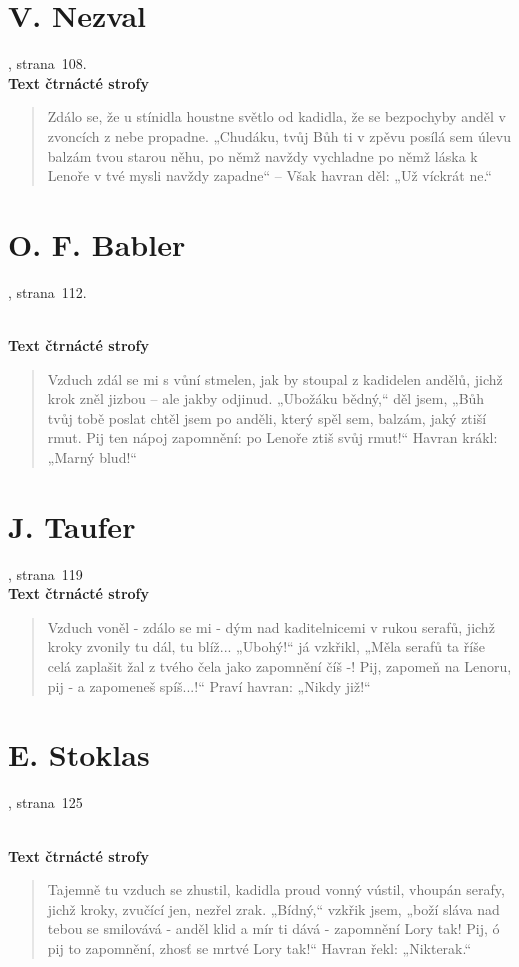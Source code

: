 \documentclass[dp.tex]{subfiles}
\begin{document}
\section*{V. Nezval}
, strana~108.
\\\textbf{Text čtrnácté strofy}
\begin{verse}
Zdálo se, že u stínidla houstne světlo od kadidla,
že se bezpochyby anděl v zvoncích z nebe propadne.
„Chudáku, tvůj Bůh ti v zpěvu posílá sem úlevu
balzám tvou starou něhu, po němž navždy vychladne
po němž láska k Lenoře v tvé mysli navždy zapadne“ –
Však havran děl: „Už víckrát ne.“
\end{verse}

\section*{O. F. Babler}
, strana~112.
\begin{samepage}
\\\textbf{Text čtrnácté strofy}
\begin{verse}
Vzduch zdál se mi s vůní stmelen, jak by stoupal z kadidelen
andělů, jichž krok zněl jizbou – ale jakby odjinud.
„Ubožáku bědný,“ děl jsem, „Bůh tvůj tobě poslat chtěl jsem
po anděli, který spěl sem, balzám, jaký ztiší rmut.
Pij ten nápoj zapomnění: po Lenoře ztiš svůj rmut!“
Havran krákl: „Marný blud!“
\end{verse}
\end{samepage}

\section*{J. Taufer}
, strana~119
\\\textbf{Text čtrnácté strofy}
\begin{verse}
Vzduch voněl - zdálo se mi - dým nad kaditelnicemi
v rukou serafů, jichž kroky zvonily tu dál, tu blíž...
„Ubohý!“ já vzkřikl, „Měla serafů ta říše celá
zaplašit žal z tvého čela jako zapomnění číš -!
Pij, zapomeň na Lenoru, pij - a zapomeneš spíš...!“
Praví havran: „Nikdy již!“
\end{verse}

\section*{E. Stoklas}
, strana~125
\begin{samepage}
\\\textbf{Text čtrnácté strofy}
\begin{verse}
Tajemně tu vzduch se zhustil, kadidla proud vonný vústil,
vhoupán serafy, jichž kroky, zvučící jen, nezřel zrak.
„Bídný,“ vzkřik jsem, „boží sláva nad tebou se smilovává -
anděl klid a mír ti dává - zapomnění Lory tak!
Pij, ó pij to zapomnění, zhosť se mrtvé Lory tak!“
Havran řekl: „Nikterak.“
\end{verse}
\end{samepage}
\end{document}
